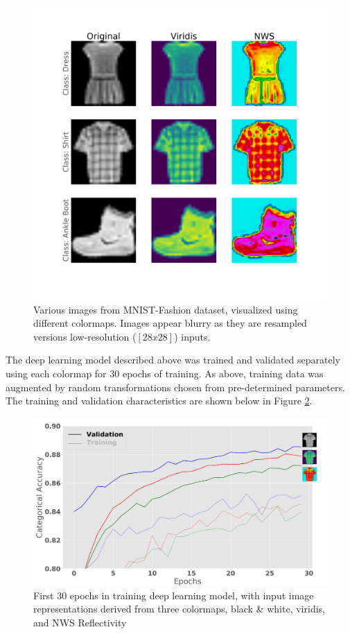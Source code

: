 \begin{figure}[h]
	\centering
	\includegraphics[width=\textwidth]{./thesis_code/plots/mnist_fashion_examples_colormapped.png}
	\caption{Various images from MNIST-Fashion dataset, visualized using different colormaps. Images appear blurry as they are resampled versions low-resolution ($[28 x 28]$) inputs.}
	\label{fig:classifying_mnist-fashion_colormaps}
\end{figure}

The deep learning model described above was trained and validated separately using each colormap for 30 epochs of training. 
As above, training data was augmented by random transformations chosen from pre-determined parameters.
The training and validation characteristics are shown below in Figure \ref{fig:classifying_colormaps-short-training}.

\begin{figure}[h]
	\centering
	\includegraphics[width=\textwidth]{./thesis_code/plots/train-val-acc_colormaps.png}
	\caption{First 30 epochs in training deep learning model, with input image representations derived from three colormaps, black \& white, viridis, and NWS Reflectivity}
	\label{fig:classifying_colormaps-short-training}
\end{figure}

